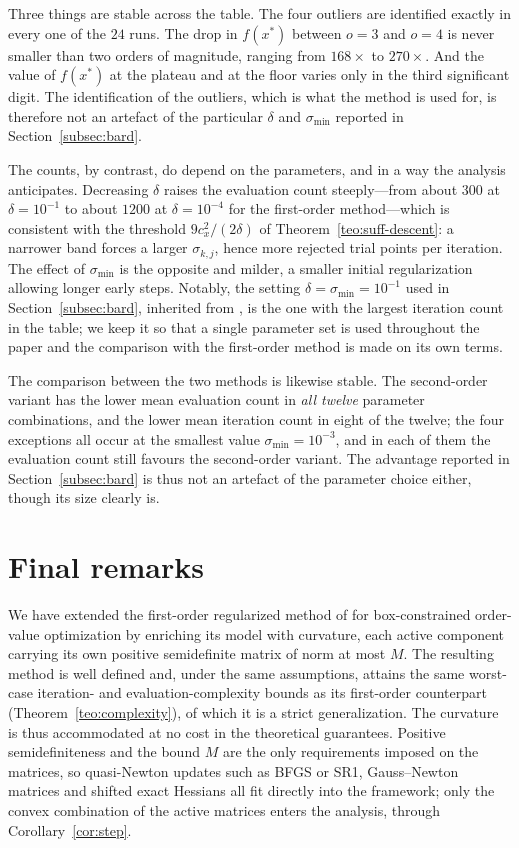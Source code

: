 \documentclass[11pt]{article}
\begin{document}
Three things are stable across the table. The four outliers are identified
exactly in every one of the $24$ runs. The drop in $f(x^*)$ between $o=3$ and
$o=4$ is never smaller than two orders of magnitude, ranging from $168\times$ to
$270\times$. And the value of $f(x^*)$ at the plateau and at the floor varies
only in the third significant digit. The identification of the outliers, which
is what the method is used for, is therefore not an artefact of the particular
$\delta$ and $\sigma_{\min}$ reported in Section~\ref{subsec:bard}.

The counts, by contrast, do depend on the parameters, and in a way the analysis
anticipates. Decreasing $\delta$ raises the evaluation count steeply---from
about $300$ at $\delta=10^{-1}$ to about $1200$ at $\delta=10^{-4}$ for the
first-order method---which is consistent with the threshold
$9c_x^2/(2\delta)$ of Theorem~\ref{teo:suff-descent}: a narrower band forces a
larger $\sigma_{k,j}$, hence more rejected trial points per iteration. The
effect of $\sigma_{\min}$ is the opposite and milder, a smaller initial
regularization allowing longer early steps. Notably, the setting
$\delta=\sigma_{\min}=10^{-1}$ used in Section~\ref{subsec:bard}, inherited from
\cite{alvarezovo}, is the one with the largest iteration count in the table; we
keep it so that a single parameter set is used throughout the paper and the
comparison with the first-order method is made on its own terms.

The comparison between the two methods is likewise stable. The second-order
variant has the lower mean evaluation count in \emph{all twelve} parameter
combinations, and the lower mean iteration count in eight of the twelve; the
four exceptions all occur at the smallest value $\sigma_{\min}=10^{-3}$, and in
each of them the evaluation count still favours the second-order variant. The
advantage reported in Section~\ref{subsec:bard} is thus not an artefact of the
parameter choice either, though its size clearly is.

\section{Final remarks} \label{sec:final}

We have extended the first-order regularized method of \cite{alvarezovo} for
box-constrained order-value optimization by enriching its model with curvature,
each active component carrying its own positive semidefinite matrix of norm at
most $M$. The resulting method is well defined and, under the same
assumptions, attains the same worst-case iteration- and evaluation-complexity
bounds as its first-order counterpart (Theorem~\ref{teo:complexity}), of which it
is a strict generalization. The curvature is thus accommodated at no cost in the
theoretical guarantees. Positive semidefiniteness and the bound $M$ are the only
requirements imposed on the matrices, so quasi-Newton updates such as BFGS or
SR1, Gauss--Newton matrices and shifted exact Hessians all fit directly into the
framework; only the convex combination of the active matrices enters the
analysis, through Corollary~\ref{cor:step}.
\end{document}
